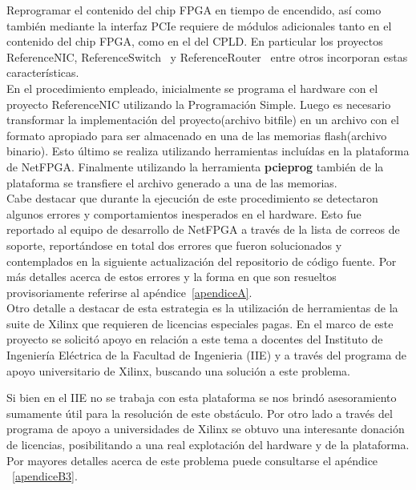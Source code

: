 Reprogramar el contenido del chip FPGA en tiempo de encendido, así como también mediante la interfaz PCIe requiere de módulos adicionales tanto en el contenido del chip FPGA, como en el del CPLD. En particular los proyectos ReferenceNIC\citep{ReferenceNICProject}, ReferenceSwitch~\citep{ReferenceSwitchProject} y ReferenceRouter~\citep{ReferenceRouterProject} entre otros incorporan estas características.\\

En el procedimiento empleado, inicialmente se programa el hardware con el proyecto ReferenceNIC utilizando la Programaci\'on Simple. Luego es necesario transformar la implementaci\'on del proyecto(archivo bitfile) en un archivo con el formato apropiado para ser almacenado en una de las memorias flash(archivo binario). Esto \'ultimo se realiza utilizando herramientas inclu\'idas en la plataforma de NetFPGA. Finalmente utilizando la herramienta \textbf{pcieprog} también de la plataforma se transfiere el archivo generado a una de las memorias.\\

Cabe destacar que durante la ejecuci\'on de este procedimiento se detectaron algunos errores y comportamientos inesperados en el hardware. Esto fue reportado al equipo de desarrollo de NetFPGA a través de la lista de correos de soporte, reportándose en total dos errores que fueron solucionados y contemplados en la siguiente actualizaci\'on del repositorio de c\'odigo fuente. Por m\'as detalles acerca de estos errores y la forma en que son resueltos provisoriamente referirse al ap\'endice~\ref{apendiceA}.\\

Otro detalle a destacar de esta estrategia es la utilizaci\'on de herramientas de la suite de Xilinx que requieren de licencias especiales pagas. En el marco de este proyecto se solicit\'o apoyo en relaci\'on a este tema a docentes del Instituto de Ingeniería Eléctrica de la Facultad de Ingenieria (IIE) y a través del programa de apoyo universitario de Xilinx, buscando una soluci\'on a este problema.

Si bien en el IIE no se trabaja con esta plataforma se nos brindó asesoramiento sumamente \'util para la resoluci\'on de este obstáculo. Por otro lado a través del programa de apoyo a universidades de Xilinx se obtuvo una interesante donaci\'on de licencias, posibilitando a una real explotaci\'on del hardware y de la plataforma. Por mayores detalles acerca de este problema puede consultarse el apéndice ~\ref{apendiceB3}.

